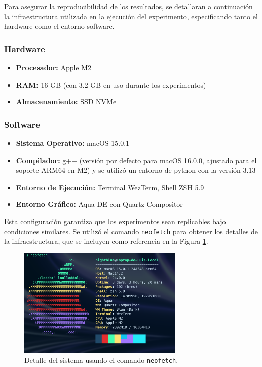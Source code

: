 Para asegurar la reproducibilidad de los resultados, se detallaran a continuación la infraestructura utilizada en la ejecución del experimento, especificando tanto el hardware como el entorno software.

\subsubsection*{Hardware}
\begin{itemize}
    \item \textbf{Procesador:} Apple M2
    \item \textbf{RAM:} 16 GB (con 3.2 GB en uso durante los experimentos)
    \item \textbf{Almacenamiento:} SSD NVMe
\end{itemize}

\subsubsection*{Software}
\begin{itemize}
    \item \textbf{Sistema Operativo:} macOS 15.0.1
    \item \textbf{Compilador:} g++ (versión por defecto para macOS 16.0.0, ajustado para el soporte ARM64 en M2) y se utilizó un entorno de python con la versión 3.13
    \item \textbf{Entorno de Ejecución:} Terminal WezTerm, Shell ZSH 5.9
    \item \textbf{Entorno Gráfico:} Aqua DE con Quartz Compositor
\end{itemize}

Esta configuración garantiza que los experimentos sean replicables bajo condiciones similares. Se utilizó el comando \texttt{neofetch} para obtener los detalles de la infraestructura, que se incluyen como referencia en la Figura \ref{fig:neofetch}.

\begin{figure}[H]
    \centering
    \includegraphics[width=0.7\textwidth]{images/neofetch.png}
    \caption{Detalle del sistema usando el comando \texttt{neofetch}.}
    \label{fig:neofetch}
\end{figure}

